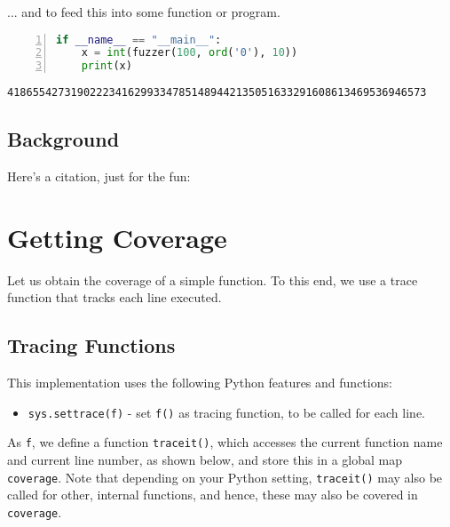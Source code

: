 \documentclass[10pt,parskip=half,
	toc=sectionentrywithdots,
	bibliography=totocnumbered,
	captions=tableheading,numbers=noendperiod]{scrartcl}
\providecommand{\tightlist}{%
  \setlength{\itemsep}{0pt}\setlength{\parskip}{0pt}}
\begin{document}
... and to feed this into some function or program.

\begin{lstlisting}[language=Python,numbers=left,xleftmargin=20pt,xrightmargin=5pt,belowskip=5pt,aboveskip=5pt]
if __name__ == "__main__":
    x = int(fuzzer(100, ord('0'), 10))
    print(x)
\end{lstlisting}

\begin{lstlisting}[language={},postbreak={},numbers=none,xrightmargin=7pt,belowskip=5pt,aboveskip=5pt,breakindent=0pt]
418655427319022234162993347851489442135051633291608613469536946573

\end{lstlisting}

\subsection{Background}\label{background}

Here's a citation, just for the fun: \cite{purdom1972}

\section{Getting Coverage}\label{getting-coverage}

Let us obtain the coverage of a simple function. To this end, we use a
trace function that tracks each line executed.

\subsection{Tracing Functions}\label{tracing-functions}

This implementation uses the following Python features and functions:

\begin{itemize}
\tightlist
\item
  \texttt{sys.settrace(f)} - set \texttt{f()} as tracing function, to be
  called for each line.
\end{itemize}

As \texttt{f}, we define a function \texttt{traceit()}, which accesses
the current function name and current line number, as shown below, and
store this in a global map \texttt{coverage}. Note that depending on
your Python setting, \texttt{traceit()} may also be called for other,
internal functions, and hence, these may also be covered in
\texttt{coverage}.
\end{document}
